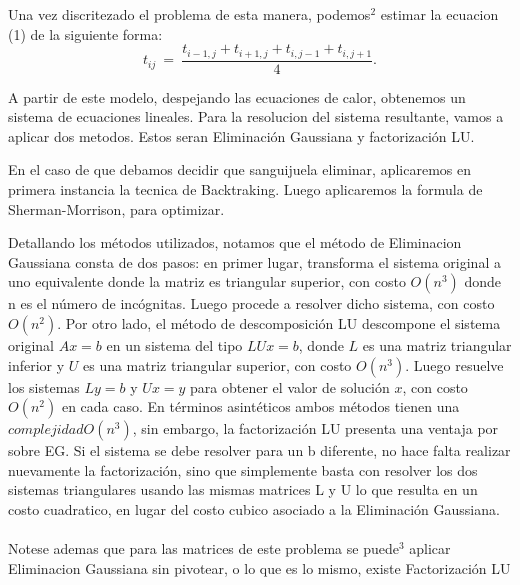 Una vez discritezado el problema de esta manera, podemos$^2$ estimar la ecuacion (1) de la siguiente forma:
\begin{equation}
t_{ij} \ =\ \frac{ t_{i-1,j} + t_{i+1,j} + t_{i,j-1} + t_{i,j+1}}{4}.\label{eq:calordd}
\end{equation}



A partir de este modelo, despejando las ecuaciones de calor, obtenemos un sistema de ecuaciones lineales.
Para la resolucion del sistema resultante, vamos a aplicar dos metodos. Estos seran Eliminaci\'on Gaussiana y factorizaci\'on LU.

En el caso de que debamos decidir que sanguijuela eliminar, aplicaremos en primera instancia la tecnica de Backtraking. Luego aplicaremos
la formula de Sherman-Morrison, para optimizar. 

Detallando los m\'etodos utilizados, notamos que el m\'etodo de Eliminacion Gaussiana consta de dos pasos: en primer
lugar, transforma el sistema original a uno equivalente donde la matriz es triangular
superior, con costo $O(n^3)$ donde n es el n\'umero de inc\'ognitas. Luego procede a resolver dicho
sistema, con costo $O(n^2)$. Por otro lado, el m\'etodo de descomposici\'on LU descompone el sistema original
$Ax = b$ en un sistema del tipo $LUx = b$, donde $L$ es una matriz triangular inferior y $U$ es una matriz
triangular superior, con costo $O(n^3)$. Luego resuelve los sistemas $Ly = b$ y
$Ux = y$ para obtener el valor de soluci\'on $x$, con costo $O(n^2)$ en cada caso. 
En t\'erminos asint\'eticos ambos m\'etodos tienen una $complejidad O(n^3)$, sin embargo, la factorizaci\'on LU presenta 
una ventaja por sobre EG. Si el sistema se debe resolver para un b diferente, no hace falta realizar nuevamente la factorizaci\'on,
sino que simplemente basta con resolver los dos sistemas triangulares usando las mismas matrices L y
U lo que resulta en un costo cuadratico, en lugar del costo cubico asociado a la Eliminaci\'on Gaussiana. \\\\

Notese ademas que para las matrices de este problema se puede$^3$ aplicar Eliminacion Gaussiana sin pivotear, o lo que es lo mismo, existe Factorizaci\'on LU
